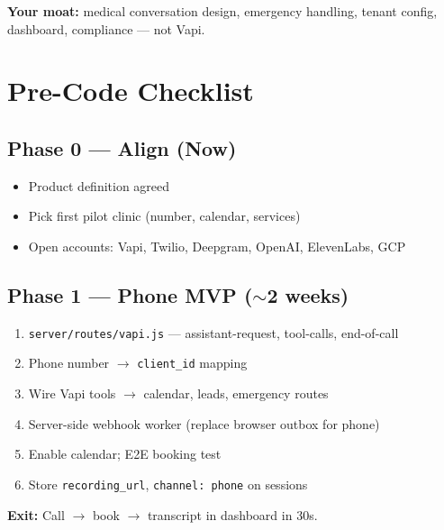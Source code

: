 \documentclass[11pt,a4paper]{article}
\begin{document}
\begin{center}
\end{center}

\textbf{Your moat:} medical conversation design, emergency handling, tenant config, dashboard, compliance --- not Vapi.

\section{Pre-Code Checklist}

\subsection{Phase 0 --- Align (Now)}
\begin{itemize}[nosep]
  \item[$\square$] Product definition agreed
  \item[$\square$] Pick first pilot clinic (number, calendar, services)
  \item[$\square$] Open accounts: Vapi, Twilio, Deepgram, OpenAI, ElevenLabs, GCP
\end{itemize}

\subsection{Phase 1 --- Phone MVP ($\sim$2 weeks)}
\begin{enumerate}[nosep]
  \item \texttt{server/routes/vapi.js} --- assistant-request, tool-calls, end-of-call
  \item Phone number $\rightarrow$ \texttt{client\_id} mapping
  \item Wire Vapi tools $\rightarrow$ calendar, leads, emergency routes
  \item Server-side webhook worker (replace browser outbox for phone)
  \item Enable calendar; E2E booking test
  \item Store \texttt{recording\_url}, \texttt{channel: phone} on sessions
\end{enumerate}
\textbf{Exit:} Call $\rightarrow$ book $\rightarrow$ transcript in dashboard in 30s.
\end{document}
